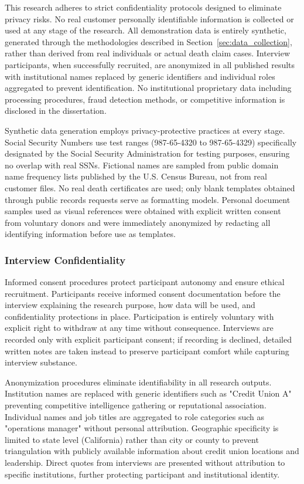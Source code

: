 This research adheres to strict confidentiality protocols designed to eliminate privacy risks. No real customer personally identifiable information is collected or used at any stage of the research. All demonstration data is entirely synthetic, generated through the methodologies described in Section~\ref{sec:data_collection}, rather than derived from real individuals or actual death claim cases. Interview participants, when successfully recruited, are anonymized in all published results with institutional names replaced by generic identifiers and individual roles aggregated to prevent identification. No institutional proprietary data including processing procedures, fraud detection methods, or competitive information is disclosed in the dissertation.

Synthetic data generation employs privacy-protective practices at every stage. Social Security Numbers use test ranges (987-65-4320 to 987-65-4329) specifically designated by the Social Security Administration for testing purposes, ensuring no overlap with real SSNs. Fictional names are sampled from public domain name frequency lists published by the U.S. Census Bureau, not from real customer files. No real death certificates are used; only blank templates obtained through public records requests serve as formatting models. Personal document samples used as visual references were obtained with explicit written consent from voluntary donors and were immediately anonymized by redacting all identifying information before use as templates.

\subsubsection{Interview Confidentiality}

Informed consent procedures protect participant autonomy and ensure ethical recruitment. Participants receive informed consent documentation before the interview explaining the research purpose, how data will be used, and confidentiality protections in place. Participation is entirely voluntary with explicit right to withdraw at any time without consequence. Interviews are recorded only with explicit participant consent; if recording is declined, detailed written notes are taken instead to preserve participant comfort while capturing interview substance.

Anonymization procedures eliminate identifiability in all research outputs. Institution names are replaced with generic identifiers such as "Credit Union A" preventing competitive intelligence gathering or reputational association. Individual names and job titles are aggregated to role categories such as "operations manager" without personal attribution. Geographic specificity is limited to state level (California) rather than city or county to prevent triangulation with publicly available information about credit union locations and leadership. Direct quotes from interviews are presented without attribution to specific institutions, further protecting participant and institutional identity.

